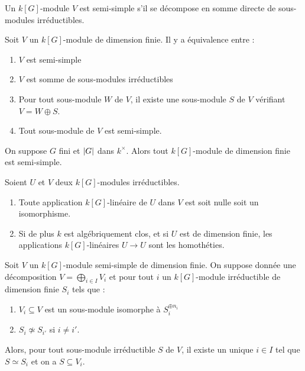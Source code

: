 \documentclass{cours}
\begin{document}
\begin{definition}
    Un $k[G]$-module $V$ est semi-simple s'il se décompose en somme directe de sous-modules irréductibles. 
\end{definition}

\begin{proposition}
    Soit $V$ un $k[G]$-module de dimension finie. Il y a équivalence entre : 
    \begin{enumerate}
        \item $V$ est semi-simple
        \item $V$ est somme de sous-modules irréductibles
        \item Pour tout sous-module $W$ de $V$, il existe une sous-module $S$ de $V$ vérifiant $V = W \oplus S$. 
        \item Tout sous-module de $V$ est semi-simple. 
    \end{enumerate}
\end{proposition}

\begin{theorem}
    On suppose $G$ fini et $\left|G\right|$ dans $k^{\times}$. Alors tout $k[G]$-module de dimension finie est semi-simple. 
\end{theorem}

\begin{lemma}
    Soient $U$ et $V$ deux $k[G]$-modules irréductibles.
    \begin{enumerate}
        \item Toute application $k[G]$-linéaire de $U$ dans $V$ est soit nulle soit un isomorphisme. 
        \item Si de plus $k$ est algébriquement clos, et si $U$ est de dimension finie, les applications $k[G]$-linéaires $U \rightarrow U$ sont les homothéties. 
    \end{enumerate}
\end{lemma}

\begin{proposition}
    Soit $V$ un $k[G]$-module semi-simple de dimension finie. On suppose donnée une décomposition $V = \bigoplus_{i \in I} V_{i}$ et pour tout $i$ un $k[G]$-module irréductible de dimension finie $S_{i}$ tels que : 
    \begin{enumerate}
        \item $V_{i} \subseteq V$ est un sous-module isomorphe à $S_{i}^{\oplus n_{i}}$
        \item $S_{i} \not \simeq S_{i'}$ si $i \neq i'$.
    \end{enumerate}
    Alors, pour tout sous-module irréductible $S$ de $V$, il existe un unique $i \in I$ tel que $S \simeq S_{i}$ et on a $S \subseteq V_{i}$.
\end{proposition}
\end{document}
